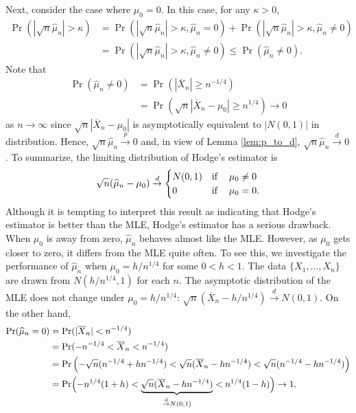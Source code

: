 \documentclass[10.5pt, A4paper, openany, uplatex]{book}
\renewcommand{\hat}{\widehat}
\renewcommand{\bar}{\overline}
\numberwithin{equation}{section}
\begin{document}
Next, consider the case where $\mu_0 = 0$.
In this case, for any $\kappa > 0$,
\begin{align*}
	\Pr\left(\left| \sqrt{n} \hat \mu_n \right| > \kappa \right) 
	& = \Pr\left(\left| \sqrt{n}\hat \mu_n \right| > \kappa, \hat \mu_n = 0\right) + \Pr\left( \left| \sqrt{n} \hat \mu_n \right| > \kappa, \hat \mu_n \neq 0\right) \\
	& = \Pr(\left| \sqrt{n} \hat \mu_n \right| > \kappa, \hat \mu_n \neq 0)  \le \Pr( \hat \mu_n \neq 0). 
\end{align*}
Note that
\begin{align*}
	\Pr( \hat \mu_n \neq 0) 
	& = \Pr(|\bar X_n| \ge n^{-1/4}) \\
	& = \Pr(\sqrt{n}|\bar X_n - \mu_0| \ge n^{1/4}) \to 0
\end{align*}
as $n \to \infty$ since $\sqrt{n}|\bar X_n - \mu_0|$ is asymptotically equivalent to $|N(0,1)|$ in distribution.
Hence, $\sqrt{n}\hat \mu_n \overset{p}{\to} 0$ and, in view of Lemma \ref{lem:p_to_d}, $\sqrt{n}\hat \mu_n \overset{d}{\to} 0$.
To summarize, the limiting distribution of Hodge's estimator is
\begin{align*}
	\sqrt{n}(\hat \mu_n - \mu_0) \overset{d}{\to} \begin{cases}
		N(0,1) & \text{if \;\; $\mu_0 \neq 0$}\\
		0      & \text{if \;\; $\mu_0 = 0$}.
	\end{cases}
\end{align*}
Although it is tempting to interpret this result as indicating that Hodge's estimator is better than the MLE, Hodge's estimator has a serious drawback.
When $\mu_0$ is away from zero, $\hat \mu_n$ behaves almost like the MLE.
However, as $\mu_0$ gets closer to zero, it differs from the MLE quite often.
To see this, we investigate the performance of $\hat \mu_n$ when $\mu_0 = h/n^{1/4}$ for some $0 < h < 1$.
The data $\{X_1, \ldots, X_n\}$ are drawn from $N(h/n^{1/4}, 1)$ for each $n$.
The asymptotic distribution of the MLE does not change under $\mu_0 = h/n^{1/4}$: $\sqrt{n}(\bar X_n - h/n^{1/4}) \overset{d}{\to} N(0,1)$.
On the other hand,
\begin{align*}
	\Pr(\hat \mu_n = 0)
	& = \Pr(|\bar X_n| < n^{-1/4}) \\
	& = \Pr(- n^{-1/4} < \bar X_n < n^{-1/4}) \\
	& = \Pr \left(- \sqrt{n}(n^{-1/4} + h n^{-1/4}) < \sqrt{n}(\bar X_n - h n^{-1/4}) < \sqrt{n}(n^{-1/4} - h n^{-1/4}) \right) \\
	& = \Pr\Bigl(-n^{1/4}(1 + h) < \underbrace{\sqrt{n}(\bar X_n - h n^{-1/4})}_{\overset{d}{\to}N(0,1)} < n^{1/4}(1 - h)\Bigr) \to 1.
\end{align*}
\end{document}
